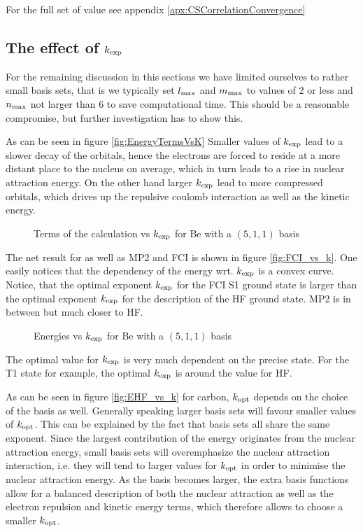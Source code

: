 For the full set of value see appendix \vref{apx:CSCorrelationConvergence}

\newcommand{\kopt}{\ensuremath k_\text{opt}}
\subsection{The effect of $k_\text{exp}$}
For the remaining discussion in this sections
we have limited ourselves to rather small basis sets,
that is we typically set $l_\text{max}$ and $m_\text{max}$ to values
of 2 or less and $n_\text{max}$ not larger than 6
to save computational time.
This should be a reasonable compromise,
but further investigation has to show this.

As can be seen in figure \vref{fig:EnergyTermsVsK}
Smaller values of $k_\text{exp}$ lead to a slower decay of the orbitals,
hence the electrons are forced to reside at a more
distant place to the nucleus on average,
which in turn leads to a rise in nuclear attraction energy.
On the other hand larger $k_\text{exp}$ lead to more compressed orbitals,
which drives up the repulsive coulomb interaction as well as the kinetic energy.

\begin{figure}
	\centering
	\caption{Terms of the \HF calculation vs $k_\text{exp}$ for Be with a $(5,1,1)$ \CS basis}
	\label{fig:EnergyTermsVsK}
\end{figure}

The net result for \HF as well as MP2 and FCI is shown in figure \vref{fig:FCI_vs_k}.
One easily notices that the dependency of the energy wrt. $k_\text{exp}$ is a
convex curve.
Notice, that the optimal exponent $k_\text{exp}$ for the FCI S1 ground state
is larger than the optimal exponent $k_\text{exp}$ for the description
of the HF ground state.
MP2 is in between but much closer to HF.

\begin{figure}
	\centering
	\caption{Energies vs $k_\text{exp}$ for Be with a $(5,1,1)$ \CS basis}
	\label{fig:FCI_vs_k}
\end{figure}

The optimal value for $k_\text{exp}$ is very much dependent on the
precise state.
For the T1 state for example, the optimal $k_\text{exp}$
is around the value for HF.

As can be seen in figure \vref{fig:EHF_vs_k}
for carbon,
$\kopt$ depends on the choice of the basis as well.
Generally speaking larger basis sets will favour
smaller values of $\kopt$.
This can be explained by the fact that \CS basis sets
all share the same exponent.
Since the largest contribution of the \HF energy
originates from the nuclear attraction energy,
small basis sets will overemphasize
the nuclear attraction interaction,
i.e. they will tend to larger values for $\kopt$
in order to minimise the nuclear attraction energy.
As the basis becomes larger,
the extra basis functions allow for a balanced
description of both the nuclear attraction
as well as the electron repulsion
and kinetic energy terms,
which therefore allows to choose a smaller $\kopt$.

